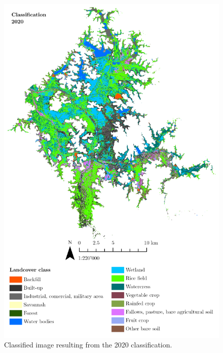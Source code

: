 \begin{figure}[H]
    \centering
    \includegraphics[width = 15cm]{figures/classi2020.png}
    \caption{Classified image resulting from the 2020 classification.}
    \label{}
\end{figure}

